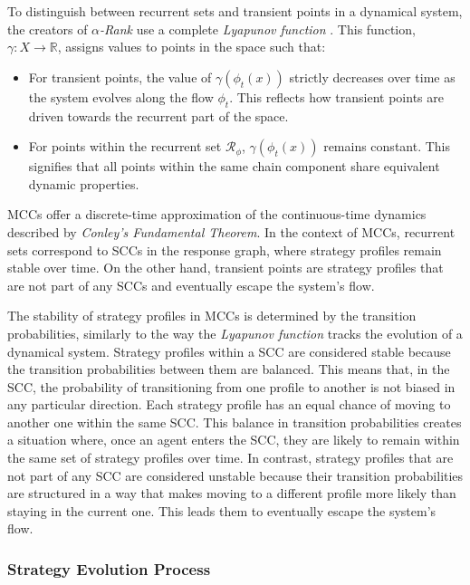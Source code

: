         \noindent
        To distinguish between recurrent sets and transient points in a dynamical system, the creators of \emph{$\alpha$-Rank} use a complete \emph{Lyapunov function} \cite{lyapunov1950}. This function, $\gamma: X \to \mathbb{R}$, assigns values to points in the space such that:
        \begin{itemize}
            \item For transient points, the value of $\gamma(\phi_t(x))$ strictly decreases over time as the system evolves along the flow $\phi_t$. This reflects how transient points are driven towards the recurrent part of the space.
            \item For points within the recurrent set $\mathcal{R}_\phi$, $\gamma(\phi_t(x))$ remains constant. This signifies that all points within the same chain component share equivalent dynamic properties.
        \end{itemize}

        \noindent
        MCCs offer a discrete-time approximation of the continuous-time dynamics described by \emph{Conley’s Fundamental Theorem}. In the context of MCCs, recurrent sets correspond to SCCs in the response graph, where strategy profiles remain stable over time. On the other hand, transient points are strategy profiles that are not part of any SCCs and eventually escape the system's flow.\tinydouble
        
        \noindent
        The stability of strategy profiles in MCCs is determined by the transition probabilities, similarly to the way the \emph{Lyapunov function} tracks the evolution of a dynamical system. Strategy profiles within a SCC are considered stable because the transition probabilities between them are balanced. This means that, in the SCC, the probability of transitioning from one profile to another is not biased in any particular direction. Each strategy profile has an equal chance of moving to another one within the same SCC. This balance in transition probabilities creates a situation where, once an agent enters the SCC, they are likely to remain within the same set of strategy profiles over time. In contrast, strategy profiles that are not part of any SCC are considered unstable because their transition probabilities are structured in a way that makes moving to a different profile more likely than staying in the current one. This leads them to eventually escape the system's flow.

    \subsubsection{Strategy Evolution Process}

